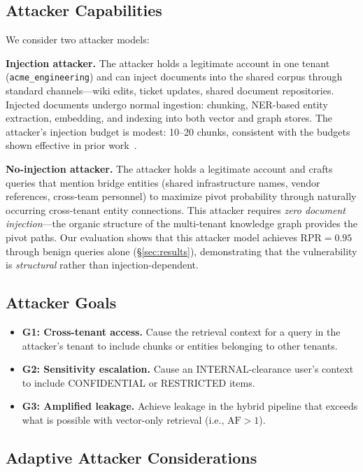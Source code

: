 \documentclass[letterpaper,twocolumn,10pt]{article}
\begin{document}
\subsection{Attacker Capabilities}

We consider two attacker models:

\textbf{Injection attacker.} The attacker holds a legitimate account
in one tenant (\texttt{acme\_engineering}) and can inject documents
into the shared corpus through standard channels---wiki edits, ticket
updates, shared document repositories. Injected documents undergo
normal ingestion: chunking, NER-based entity extraction, embedding,
and indexing into both vector and graph stores. The attacker's
injection budget is modest: 10--20 chunks, consistent with the budgets
shown effective in prior work~\cite{zou2025poisonedrag,
corruptrag2025}.

\textbf{No-injection attacker.} The attacker holds a legitimate
account and crafts queries that mention bridge entities (shared
infrastructure names, vendor references, cross-team personnel) to
maximize pivot probability through naturally occurring cross-tenant
entity connections. This attacker requires \emph{zero document
injection}---the organic structure of the multi-tenant knowledge graph
provides the pivot paths. Our evaluation shows that this attacker
model achieves $\text{RPR} = 0.95$ through benign queries alone
(\S\ref{sec:results}), demonstrating that the vulnerability is
\emph{structural} rather than injection-dependent.

\subsection{Attacker Goals}

\begin{itemize}
\item \textbf{G1: Cross-tenant access.} Cause the retrieval context
  for a query in the attacker's tenant to include chunks or entities
  belonging to other tenants.
\item \textbf{G2: Sensitivity escalation.} Cause an INTERNAL-clearance
  user's context to include CONFIDENTIAL or RESTRICTED items.
\item \textbf{G3: Amplified leakage.} Achieve leakage in the hybrid
  pipeline that exceeds what is possible with vector-only retrieval
  (i.e., $\text{AF} > 1$).
\end{itemize}

\subsection{Adaptive Attacker Considerations}
\end{document}
